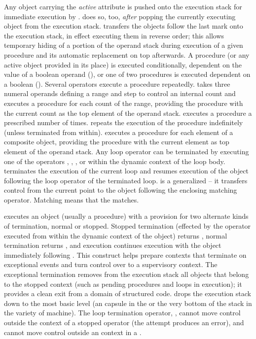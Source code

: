 Any object carrying the \emph{active} attribute is pushed onto the
execution stack for immediate execution by .  does
so, too, \emph{after} popping the currently executing object from the
execution stack.  transfers the objects follow the last mark
onto the execution stack, in effect executing them in reverse order;
this allows temporary hiding of a portion of the operand stack during
execution of a given procedure and its automatic replacement on top
afterwards. A procedure (or any active object provided in its place)
is executed conditionally, dependent on the value of a boolean operand
(), or one of two procedures is executed dependent on a boolean
(). Several operators execute a procedure
repeatedly.  takes three numeral operands defining a range and
step to control an internal count and executes a procedure for each
count of the range, providing the procedure with the current count as
the top element of the operand stack.  executes a procedure
a prescribed number of times.  repeats the execution of the
procedure indefinitely (unless terminated from within). 
executes a procedure for each element of a composite object, providing
the procedure with the current element as top element of the operand
stack. Any loop operator can be terminated by executing one of the
operators , , , or  within the
dynamic context of the loop body.  terminates the execution
of the current loop and resumes execution of the object following the
loop operator of the terminated loop.  is a generalized
 -- it transfers control from the current point to the object
following the enclosing matching  operator. Matching
means that the  matches.

 executes an object (usually a procedure) with a provision
for two alternate kinds of termination, normal or stopped. Stopped
termination (effected by the  operator executed from within
the dynamic context of the object) returns , normal
termination returns , and execution continues execution with
the object immediately following . This construct helps
prepare contexts that terminate on exceptional events and turn control
over to a supervisory context. The exceptional termination removes
from the execution stack all objects that belong to the stopped
context (such as pending procedures and loops in execution); it
provides a clean exit from a domain of structured code. 
drops the execution stack down to the most basic level (an
 capsule in the  or the very bottom of the
stack in the  variety of machine). The loop termination
operator, , cannot move control outside the context of a
stopped operator (the attempt produces an error), and  cannot
move control outside an  context in a .

